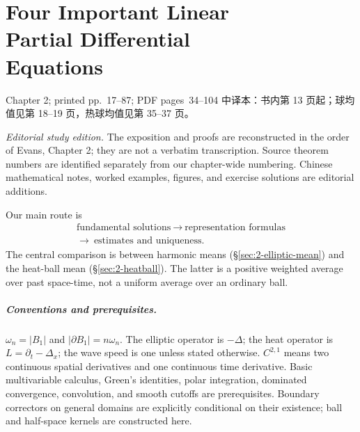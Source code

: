 \chapter[Four Important Linear Partial Differential Equations]{Four Important Linear\\Partial Differential\\Equations}
\label{chap:four-important-linear-partial-differential-equations}

\PDESource
  {Chapter 2; printed pp.~17--87; PDF pages~34--104}
  {中译本：书内第 13 页起；球均值见第 18--19 页，热球均值见第 35--37 页。}

\noindent\textit{Editorial study edition.}
The exposition and proofs are reconstructed in the order of Evans,
Chapter 2; they are not a verbatim transcription. Source theorem numbers
are identified separately from our chapter-wide numbering. Chinese
mathematical notes, worked examples, figures, and exercise solutions are
editorial additions.

\Needspace{45mm}
Our main route is
\[
 \begin{gathered}
 \text{fundamental solutions}\ \longrightarrow\
 \text{representation formulas}\\
 \longrightarrow\ \text{estimates and uniqueness}.
 \end{gathered}
\]
The central comparison is between harmonic means
(\S\ref{sec:2-elliptic-mean}) and the heat-ball mean
(\S\ref{sec:2-heatball}). The latter is a positive weighted average over
past space-time, not a uniform average over an ordinary ball.

\paragraph{Conventions and prerequisites.}
$\omega_n=|B_1|$ and $|\partial B_1|=n\omega_n$.
The elliptic operator is $-\Delta$; the heat operator is
$L=\partial_t-\Delta_x$; the wave speed is one unless stated otherwise.
$C^{2,1}$ means two continuous spatial derivatives and one continuous
time derivative. Basic multivariable calculus, Green's identities,
polar integration, dominated convergence, convolution, and smooth
cutoffs are prerequisites. Boundary correctors on general domains are
explicitly conditional on their existence; ball and half-space kernels
are constructed here.

\clearpage







